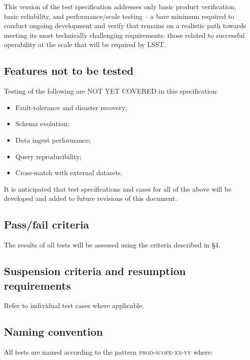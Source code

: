 \documentclass[DM,lsstdraft,STS,toc]{lsstdoc}
\begin{document}
This version of the \product{} test specification addresses only basic product verification, basic
reliability, and performance/scale testing -- a bare minimum required to conduct ongoing development
and verify that \product{} remains on a realistic path towards meeting its most technically challenging
requirements: those related to successful operability at the scale that will be required by LSST.

\subsection{Features not to be tested}
\label{sec:featnot2test}

Testing of the following are NOT YET COVERED in this specification:

\begin{itemize}
  \item{Fault-tolerance and disaster recovery;}
  \item{Schema evolution;}
  \item{Data ingest performance;}
  \item{Query reproducibility;}
  \item{Cross-match with external datasets.}
\end{itemize}

It is anticipated that test specifications and cases for all of the above will be developed
and added to future revisions of this document.

\subsection{Pass/fail criteria}
\label{sec:passfail}

The results of all tests will be assessed using the criteria described in  \S4.

\subsection{Suspension criteria and resumption requirements}
\label{suspension}

Refer to individual test cases where applicable.

\subsection{Naming convention}

All tests are named according to the pattern \textsc{prod-scope-xx-yy} where:
\end{document}
